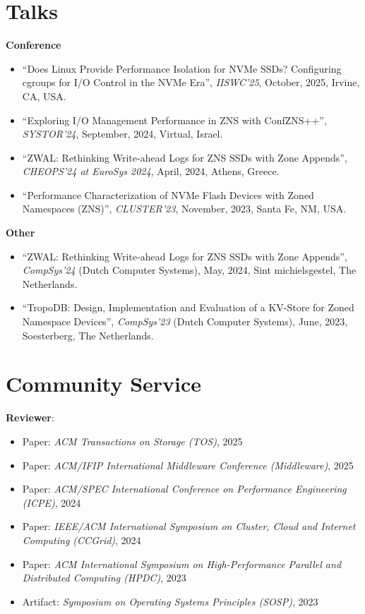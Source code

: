 \documentclass[letterpaper,11pt]{article}
\begin{document}
\section{Talks}
    \textbf{Conference}
    \begin{itemize}[label={}]
    \item
        ``Does Linux Provide Performance Isolation for NVMe SSDs? Configuring cgroups for I/O Control in the NVMe Era'',
        \textit{IISWC'25}, October, 2025, Irvine, CA, USA.
    \item
        ``Exploring I/O Management Performance in ZNS with ConfZNS++'',
        \textit{SYSTOR'24}, September, 2024, Virtual, Israel.
    \item
        ``ZWAL: Rethinking Write-ahead Logs for ZNS SSDs with Zone Appends'',
        \textit{CHEOPS'24 at EuroSys 2024}, April, 2024, Athens, Greece.
    \item
        ``Performance Characterization of NVMe Flash Devices with Zoned Namespaces (ZNS)'',
        \textit{CLUSTER'23}, November, 2023, Santa Fe, NM, USA.
    \end{itemize}
    
    \textbf{Other}
    \begin{itemize}[label={}]
    \item
      ``ZWAL: Rethinking Write-ahead Logs for ZNS SSDs with Zone Appends'',
      \textit{CompSys'24} (Dutch Computer Systems), May, 2024, Sint michielsgestel, The Netherlands.
    
    \item
      ``TropoDB: Design, Implementation and Evaluation of a KV-Store for Zoned Namespace Devices'',
      \textit{CompSys'23} (Dutch Computer Systems), June, 2023, Soesterberg, The Netherlands.
    \end{itemize}

\section{Community Service}
\textbf{Reviewer}:
\begin{itemize}[label={}]
\itemsep0em
  \item Paper: \textit{ACM Transactions on Storage (TOS)}, 2025
  
  \item Paper: \textit{ACM/IFIP International Middleware Conference (Middleware)}, 2025
  
  \item Paper: \textit{ACM/SPEC International Conference on Performance Engineering (ICPE)}, 2024
  
  \item Paper: \textit{IEEE/ACM International Symposium on Cluster, Cloud and Internet Computing (CCGrid)}, 2024
   
  \item Paper: \textit{ACM International Symposium on High-Performance Parallel and Distributed Computing (HPDC)}, 2023

  \item Artifact: \textit{Symposium on Operating Systems Principles (SOSP)}, 2023
\end{itemize}
\end{document}
